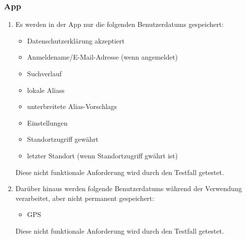 \subsubsection*{App}

\begin{samepage}
    \begin{enumerate}[label=\textbf{/NFD\arabic*0/}, align=left]
        \item \label{/NFD10/} Es werden in der App nur die folgenden \Glspl{Benutzerdatum} gespeichert:
            \begin{itemize}
                \item Datenschutzerklärung akzeptiert
                \item Anmeldename/E-Mail-Adresse (wenn angemeldet)
                \item Suchverlauf
                \item \gls{lokal}e \Glspl{Alias}
                \item unterbreitete \Glspl{Alias-Vorschlag}
                \item Einstellungen
                \item Standortzugriff gewährt
                \item letzter Standort (wenn Standortzugriff gwährt ist)
            \end{itemize}
            Diese nicht funktionale Anforderung wird durch den Testfall  getestet.
        \item \label{/NFD20/} Darüber hinaus werden folgende \Glspl{Benutzerdatum} während der Verwendung verarbeitet, aber nicht permanent gespeichert:
            \begin{itemize}
                \item \Gls{GPS}
            \end{itemize}
            Diese nicht funktionale Anforderung wird durch den Testfall  getestet.
    \end{enumerate}
\end{samepage}
